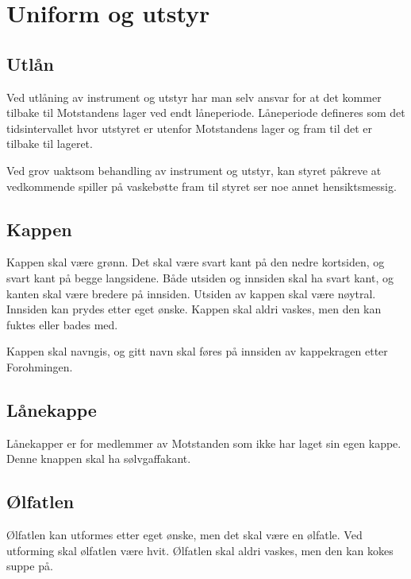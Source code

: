 \section{Uniform og utstyr}
    \subsection{Utlån}
        \begin{statute}
            Ved utlåning av instrument og utstyr har man selv ansvar for at det kommer tilbake til Motstandens lager ved endt låneperiode. Låneperiode defineres som det tidsintervallet hvor utstyret er utenfor Motstandens lager og fram til det er tilbake til lageret.
        \end{statute}
        \begin{statute}
            Ved grov uaktsom behandling av instrument og utstyr, kan styret påkreve at vedkommende spiller på vaskebøtte fram til styret ser noe annet hensiktsmessig. 
        \end{statute}

    \subsection{Kappen}
            \begin{statute}
                Kappen skal være grønn. Det skal være svart kant på den nedre kortsiden, og svart kant på begge langsidene. Både utsiden og innsiden skal ha svart kant, og kanten skal være bredere på innsiden. Utsiden av kappen skal være nøytral. Innsiden kan prydes etter eget ønske. Kappen skal aldri vaskes, men den kan fuktes eller bades med.
            \end{statute}

            \begin{statute}
                Kappen skal navngis, og gitt navn skal føres på innsiden av kappekragen etter Forohmingen.
            \end{statute}

    \subsection{Lånekappe}
        \begin{statute}
            Lånekapper er for medlemmer av Motstanden som ikke har laget sin egen kappe. Denne knappen skal ha sølvgaffakant.
        \end{statute}

    \subsection{Ølfatlen}
        \begin{statute}
            Ølfatlen kan utformes etter eget ønske, men det skal være en ølfatle. Ved utforming skal ølfatlen være hvit. Ølfatlen skal aldri vaskes, men den kan kokes suppe på.
        \end{statute}
        
